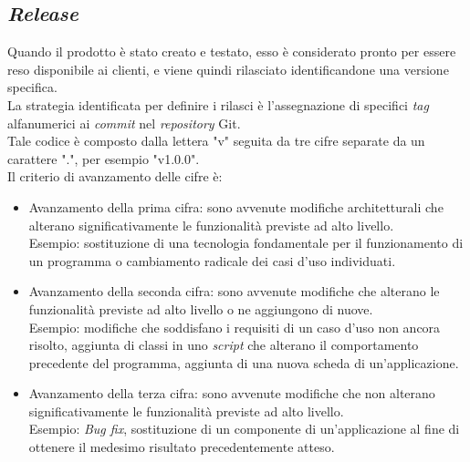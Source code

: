 \subsection{\emph{Release}}
Quando il prodotto è stato creato e testato, esso è considerato pronto per essere reso disponibile ai clienti, e viene quindi rilasciato identificandone una versione specifica.\\
La strategia identificata per definire i rilasci è l'assegnazione di specifici \emph{tag} alfanumerici ai \emph{commit} nel \emph{repository} Git.\\
Tale codice è composto dalla lettera "v" seguita da tre cifre separate da un carattere ".", per esempio "v1.0.0".\\
Il criterio di avanzamento delle cifre è: 
\begin{itemize}
    \item Avanzamento della prima cifra: sono avvenute modifiche architetturali che alterano significativamente le funzionalità previste ad alto livello.\\
    Esempio: sostituzione di una tecnologia fondamentale per il funzionamento di un programma o cambiamento radicale dei casi d'uso individuati.  
    \item Avanzamento della seconda cifra: sono avvenute modifiche che alterano le funzionalità previste ad alto livello o ne aggiungono di nuove.\\
    Esempio: modifiche che soddisfano i requisiti di un caso d'uso non ancora risolto, aggiunta di classi in uno \emph{script} che alterano il comportamento precedente del programma, aggiunta di una nuova scheda di un'applicazione.
    \item Avanzamento della terza cifra: sono avvenute modifiche che non alterano significativamente le funzionalità previste ad alto livello.\\
    Esempio: \emph{Bug fix}, sostituzione di un componente di un'applicazione al fine di ottenere il medesimo risultato precedentemente atteso. 
\end{itemize}
    

